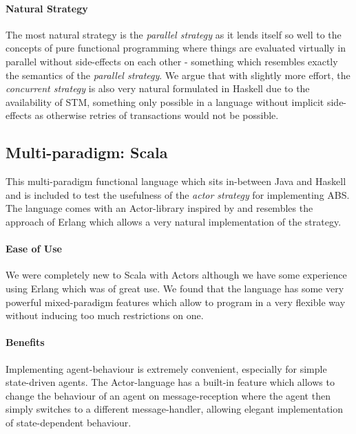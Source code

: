 \paragraph{Natural Strategy}
The most natural strategy is the \textit{parallel strategy} as it lends itself so well to the concepts of pure functional programming where things are evaluated virtually in parallel without side-effects on each other - something which resembles exactly the semantics of the \textit{parallel strategy}. We argue that with slightly more effort, the \textit{concurrent strategy} is also very natural formulated in Haskell due to the availability of STM, something only possible in a language without implicit side-effects as otherwise retries of transactions would not be possible.



\subsection{Multi-paradigm: Scala}

This multi-paradigm functional language which sits in-between Java and Haskell and is included to test the usefulness of the \textit{actor strategy} for implementing ABS. The language comes with an Actor-library inspired by \cite{agha_actors:_1986} and resembles the approach of Erlang which allows a very natural implementation of the strategy.

\paragraph{Ease of Use}
We were completely new to Scala with Actors although we have some experience using Erlang which was of great use. We found that the language has some very powerful mixed-paradigm features which allow to program in a very flexible way without inducing too much restrictions on one.

\paragraph{Benefits}
Implementing agent-behaviour is extremely convenient, especially for simple state-driven agents. The Actor-language has a built-in feature which allows to change the behaviour of an agent on message-reception where the agent then simply switches to a different message-handler, allowing elegant implementation of state-dependent behaviour. 

